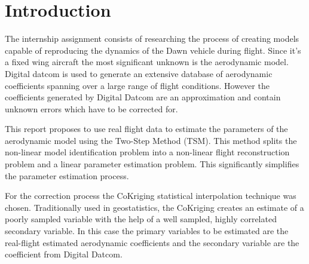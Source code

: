 \chapter{Introduction}

\begin{comment}
Some information about Dawn
\end{comment}

The internship assignment consists of researching the process of creating models capable of reproducing the dynamics of the Dawn vehicle during flight. Since it's a fixed wing aircraft the most significant unknown is the aerodynamic model. Digital datcom is used to generate an extensive database of aerodynamic coefficients spanning over a large range of flight conditions. However the coefficients generated by Digital Datcom are an approximation and contain unknown errors which have to be corrected for. 

This report proposes to use real flight data to estimate the parameters of the aerodynamic model using the Two-Step Method (TSM). This method splits the non-linear model identification problem into a non-linear flight reconstruction problem and a linear parameter estimation problem. This significantly simplifies the parameter estimation process.

For the correction process the CoKriging statistical interpolation technique was chosen. Traditionally used in geostatistics, the CoKriging creates an estimate of a poorly sampled variable with the help of a well sampled, highly correlated secondary variable. In this case the primary variables to be estimated are the real-flight estimated aerodynamic coefficients and the secondary variable are the coefficient from Digital Datcom.


